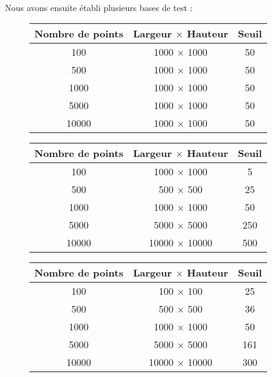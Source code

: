 \paragraph{}
Nous avons ensuite établi plusieurs bases de test :

\begin{figure}[ht]
\begin{center}
\begin{tabular}{|*{3}{c|}}
    \hline
     Nombre de points  & Largeur $\times$ Hauteur  & Seuil \\
    \hline
    100  & 1000 $\times$ 1000 & 50 \\
    \hline
    500  & 1000 $\times$ 1000  & 50 \\
    \hline
    1000  & 1000 $\times$ 1000  & 50 \\
    \hline
    5000  & 1000 $\times$ 1000  & 50 \\
    \hline
    10000  & 1000 $\times$ 1000  & 50 \\
    \hline
\end{tabular}
\end{center}
\end{figure}

\begin{figure}[ht]
\begin{center}
\begin{tabular}{|*{3}{c|}}
    \hline
     Nombre de points  & Largeur $\times$ Hauteur  & Seuil \\
    \hline
    100  & 1000 $\times$ 1000 & 5 \\
    \hline
    500  & 500 $\times$ 500  & 25 \\
    \hline
    1000  & 1000 $\times$ 1000  & 50 \\
    \hline
    5000  & 5000 $\times$ 5000  & 250 \\
    \hline
    10000  & 10000 $\times$ 10000  & 500 \\
    \hline
\end{tabular}
\end{center}
\end{figure}

\begin{figure}[ht]
\begin{center}
\begin{tabular}{|*{3}{c|}}
    \hline
     Nombre de points  & Largeur $\times$ Hauteur  & Seuil \\
    \hline
    100  & 100 $\times$ 100 & 25 \\
    \hline
    500  & 500 $\times$ 500  & 36 \\
    \hline
    1000  & 1000 $\times$ 1000  & 50 \\
    \hline
    5000  & 5000 $\times$ 5000  & 161 \\
    \hline
    10000  & 10000 $\times$ 10000  & 300 \\
    \hline
\end{tabular}
\end{center}
\end{figure}

